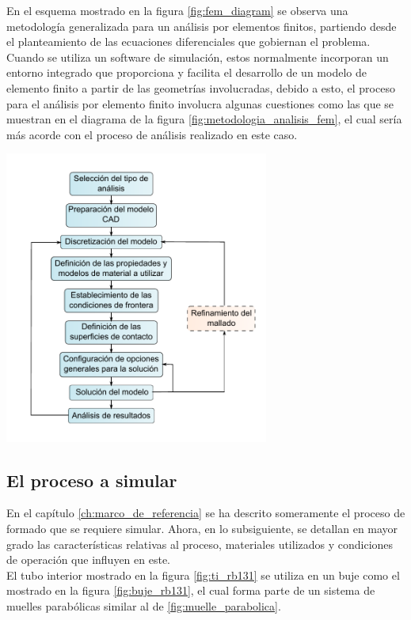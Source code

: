 En el esquema mostrado en la figura \ref{fig:fem_diagram} se observa una metodología generalizada 
para un análisis por elementos finitos, partiendo desde el planteamiento de las 
ecuaciones diferenciales que gobiernan el problema. Cuando se utiliza un software 
de simulación, estos normalmente incorporan un entorno integrado que 
proporciona y facilita el desarrollo de un modelo de elemento finito a partir 
de las geometrías involucradas, debido a esto, el proceso para el análisis por elemento 
finito involucra algunas cuestiones como las que se muestran en el diagrama de 
la figura \ref{fig:metodologia_analisis_fem}, el cual sería más acorde con 
el proceso de análisis realizado en este caso.

\begin{center}
\includegraphics[width=0.65\textwidth]{src/ch3/metodologia_analisis_fem.pdf}
\label{fig:metodologia_analisis_fem}
\end{center}

\subsection{El proceso a simular}

En el capítulo \ref{ch:marco_de_referencia} se ha descrito someramente el proceso de formado que se requiere 
simular. Ahora, en lo subsiguiente, se detallan en mayor grado las características 
relativas al proceso, materiales utilizados y condiciones de operación que influyen en este. \\

El tubo interior mostrado en la figura \ref{fig:ti_rb131} se utiliza en un buje como 
el mostrado en la figura \ref{fig:buje_rb131}, el cual forma parte de un sistema de muelles 
parabólicas similar al de \ref{fig:muelle_parabolica}.

